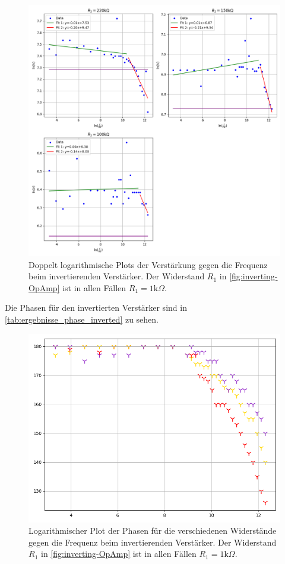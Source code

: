\begin{figure}
    \centering
    \includegraphics[width=\linewidth]{figures/inverted_gain.png}
        \caption{Doppelt logarithmische Plots der Verstärkung gegen die Frequenz beim invertierenden Verstärker. Der Widerstand $R_1$ in \autoref{fig:inverting-OpAmp} ist in allen Fällen $R_1 = 1\text{k$\Omega$}$.}
    \label{tab:ergebnisse_verstärkung_inverted}
\end{figure}

Die Phasen für den invertierten Verstärker sind in \autoref{tab:ergebnisse_phase_inverted} zu sehen.

\begin{figure}
    \centering
    \includegraphics[width=0.6\linewidth]{figures/inverted_phase.png}
        \caption{Logarithmischer Plot der Phasen für die verschiedenen Widerstände gegen die Frequenz beim invertierenden Verstärker. Der Widerstand $R_1$ in \autoref{fig:inverting-OpAmp} ist in allen Fällen $R_1 = 1\text{k$\Omega$}$.}
    \label{tab:ergebnisse_phase_inverted}
\end{figure}

